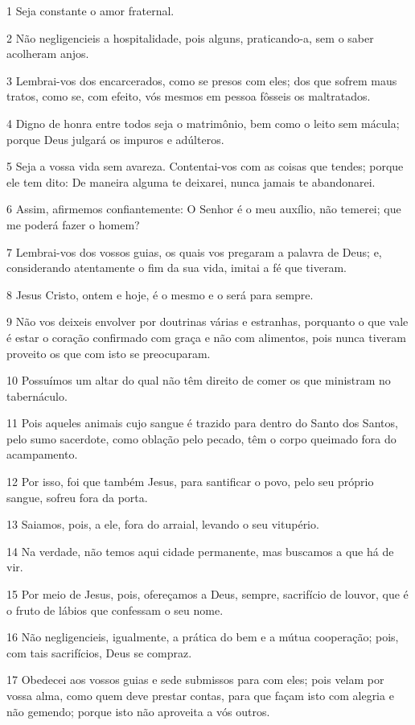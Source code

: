 \par 1 Seja constante o amor fraternal.
\par 2 Não negligencieis a hospitalidade, pois alguns, praticando-a, sem o saber acolheram anjos.
\par 3 Lembrai-vos dos encarcerados, como se presos com eles; dos que sofrem maus tratos, como se, com efeito, vós mesmos em pessoa fôsseis os maltratados.
\par 4 Digno de honra entre todos seja o matrimônio, bem como o leito sem mácula; porque Deus julgará os impuros e adúlteros.
\par 5 Seja a vossa vida sem avareza. Contentai-vos com as coisas que tendes; porque ele tem dito: De maneira alguma te deixarei, nunca jamais te abandonarei.
\par 6 Assim, afirmemos confiantemente: O Senhor é o meu auxílio, não temerei; que me poderá fazer o homem?
\par 7 Lembrai-vos dos vossos guias, os quais vos pregaram a palavra de Deus; e, considerando atentamente o fim da sua vida, imitai a fé que tiveram.
\par 8 Jesus Cristo, ontem e hoje, é o mesmo e o será para sempre.
\par 9 Não vos deixeis envolver por doutrinas várias e estranhas, porquanto o que vale é estar o coração confirmado com graça e não com alimentos, pois nunca tiveram proveito os que com isto se preocuparam.
\par 10 Possuímos um altar do qual não têm direito de comer os que ministram no tabernáculo.
\par 11 Pois aqueles animais cujo sangue é trazido para dentro do Santo dos Santos, pelo sumo sacerdote, como oblação pelo pecado, têm o corpo queimado fora do acampamento.
\par 12 Por isso, foi que também Jesus, para santificar o povo, pelo seu próprio sangue, sofreu fora da porta.
\par 13 Saiamos, pois, a ele, fora do arraial, levando o seu vitupério.
\par 14 Na verdade, não temos aqui cidade permanente, mas buscamos a que há de vir.
\par 15 Por meio de Jesus, pois, ofereçamos a Deus, sempre, sacrifício de louvor, que é o fruto de lábios que confessam o seu nome.
\par 16 Não negligencieis, igualmente, a prática do bem e a mútua cooperação; pois, com tais sacrifícios, Deus se compraz.
\par 17 Obedecei aos vossos guias e sede submissos para com eles; pois velam por vossa alma, como quem deve prestar contas, para que façam isto com alegria e não gemendo; porque isto não aproveita a vós outros.
